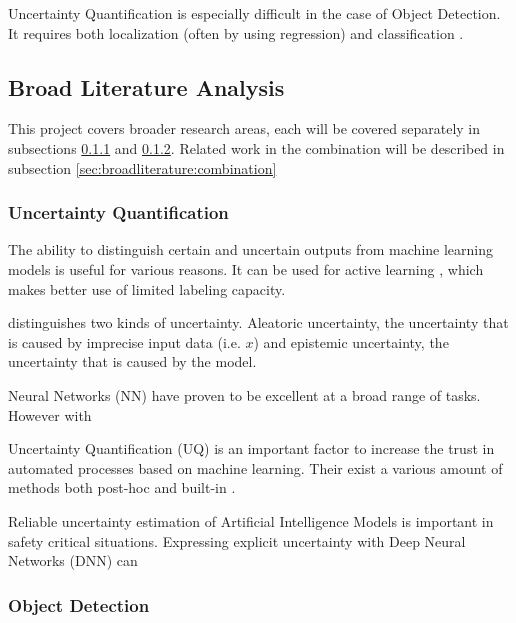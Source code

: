 Uncertainty Quantification is especially difficult in the case of Object Detection. It requires both localization (often by using regression) and classification \cite{Gasperini_2022}.

\subsection{Broad Literature Analysis}\label{sec:broadliterature}

This project covers broader research areas, each will be covered separately in subsections \ref{sec:broadliterature:uncertainty} and \ref{sec:broadliterature:object_detection}. Related work in the combination will be described in subsection \ref{sec:broadliterature:combination}

\subsubsection{Uncertainty Quantification}\label{sec:broadliterature:uncertainty}
The ability to distinguish certain and uncertain outputs from machine learning models is useful for various reasons. It can be used for active learning \cite{yang2009effective, settles2009active, Bernhardt_2022}, which makes better use of limited labeling capacity.

\citep{gal2016uncertainty} distinguishes two kinds of uncertainty. Aleatoric uncertainty, the uncertainty that is caused by imprecise input data (i.e. $x$) and epistemic uncertainty, the uncertainty that is caused by the model.

Neural Networks (NN) have proven to be excellent at a broad range of tasks. However with

Uncertainty Quantification (UQ) is an important factor to increase the trust in automated processes based on machine learning. Their exist a various amount of methods both post-hoc  and built-in .



Reliable uncertainty estimation of Artificial Intelligence Models is important in safety critical situations. Expressing explicit uncertainty with Deep Neural Networks (DNN) can

\subsubsection{Object Detection}\label{sec:broadliterature:object_detection}


